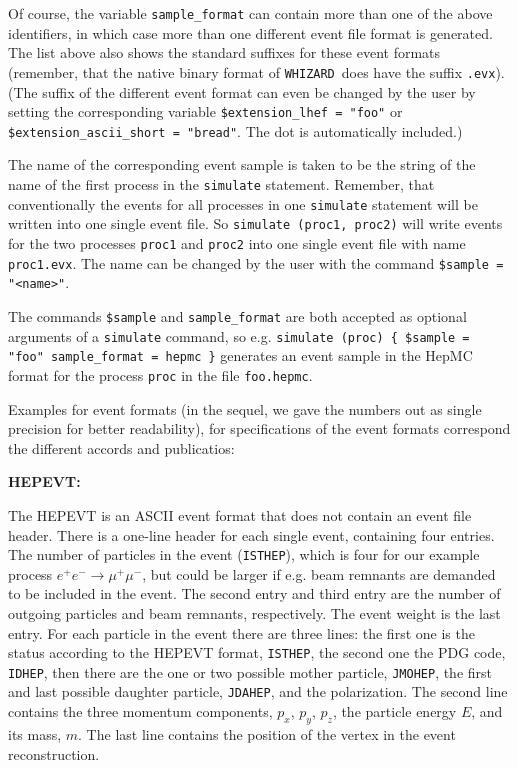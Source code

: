 \documentclass[12pt]{book}
\newcommand{\ttt}[1]{\texttt{#1}}
\newcommand{\whizard}{\texttt{WHIZARD}}
\newcommand{\eemm}{$e^+e^- \to \mu^+\mu^-$}
\begin{document}
Of course, the variable \ttt{sample\_format} can contain more than one
of the above identifiers, in which case more  than one different event
file format is generated. The list above also shows the standard
suffixes for these event formats (remember, that the native binary
format of \whizard\ does have the suffix \ttt{.evx}). (The suffix of
the different event format can even be changed by the user by setting
the corresponding variable \ttt{\$extension\_lhef = "foo"} or 
\ttt{\$extension\_ascii\_short = "bread"}. The dot is automatically
included.) 

The name of the corresponding event sample is taken to be the string
of the name of the first process in the \ttt{simulate}
statement. Remember, that conventionally the events for all processes
in one \ttt{simulate} statement will be written into one single event
file. So \ttt{simulate (proc1, proc2)} will write events for the two
processes \ttt{proc1} and \ttt{proc2} into one single event file with
name \ttt{proc1.evx}. The name can be changed by the user with the
command \ttt{\$sample = "<name>"}. 

The commands \ttt{\$sample} and \ttt{sample\_format} are both accepted
as optional arguments of a \ttt{simulate} command, so e.g. 
\ttt{simulate (proc) \{ \$sample = "foo" sample\_format = hepmc \}}
generates an event sample in the HepMC format for the process
\ttt{proc} in the file \ttt{foo.hepmc}. 

Examples for event formats (in the sequel, we gave the numbers out as
single precision for better readability), for specifications of the
event formats correspond the different accords and publicatios: 

{\bf HEPEVT:}

The HEPEVT is an ASCII event format that does not contain an event
file header. There is a one-line header for each single event,
containing four entries. The number of particles in the event
(\ttt{ISTHEP}), which is four for our example process \eemm, but could
be larger if e.g. beam remnants are demanded to be included in the
event. The second entry and third entry are the number of outgoing
particles and beam remnants, respectively. The event weight is the
last entry. For each particle in the event there are three lines: 
the first one is the status according to the HEPEVT format,
\ttt{ISTHEP}, the second one the PDG code, \ttt{IDHEP}, then there are
the one or two possible mother particle, \ttt{JMOHEP}, the first and
last possible daughter particle, \ttt{JDAHEP}, and the polarization. 
The second line contains the three momentum components, $p_x$, $p_y$,
$p_z$, the particle energy $E$, and its mass, $m$. 
The last line contains the position of the vertex in the event
reconstruction. 
\end{document}
